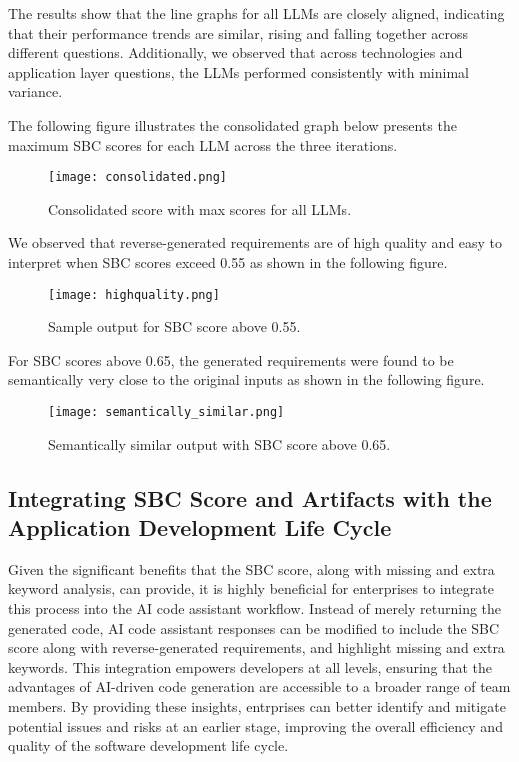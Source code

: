 \documentclass{article}
\begin{document}
The results show that the line graphs for all LLMs are closely aligned, indicating that their performance trends are similar, rising and falling together across different questions. Additionally, we observed that across technologies and application layer questions, the LLMs performed consistently with minimal variance.  

The following figure illustrates the consolidated graph below presents the maximum SBC scores for each LLM across the three iterations.  

\vspace{-10pt}
\begin{figure}[H]
    \centering
    \texttt{[image: consolidated.png]}
    \caption{Consolidated score with max scores  for all LLMs.}
    \label{fig:sample4}
\end{figure}


We observed that reverse-generated requirements are of high quality and easy to interpret when SBC scores exceed 0.55 as shown in the following figure. 

\vspace{-10pt}
\begin{figure}[H]
    \centering
    \texttt{[image: highquality.png]}
    \caption{ Sample output for SBC score above 0.55.}
    \label{fig:sample5}
\end{figure}


For SBC scores above 0.65, the generated requirements were found to be semantically very close to the original inputs as shown in the following figure. 

\vspace{-10pt}
\begin{figure}[H]
    \centering
    \texttt{[image: semantically\_similar.png]}
    \caption{ Semantically similar output with SBC score above 0.65.}
    \label{fig:sample6}
\end{figure}

\subsection{Integrating SBC Score and Artifacts with the Application Development Life Cycle}

Given the significant benefits that the SBC score, along with missing and extra keyword analysis, can provide, it is highly beneficial for enterprises to integrate this process into the AI code assistant workflow. Instead of merely returning the generated code, AI code assistant responses can be modified  to include the SBC score along with reverse-generated requirements, and highlight missing and extra keywords. This integration empowers developers at all levels, ensuring that the advantages of AI-driven code generation are accessible to a broader range of team members. By providing these insights, entrprises can better identify and mitigate potential issues and risks at an earlier stage, improving the overall efficiency and quality of the software development life cycle.
\end{document}
